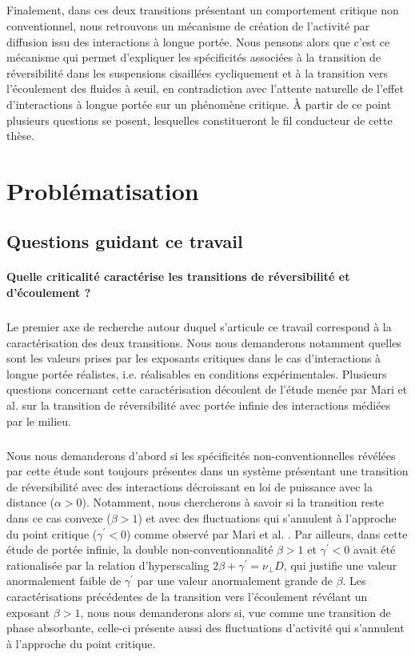 \subparagraph{}Finalement, dans ces deux transitions présentant un comportement critique non conventionnel, nous retrouvons un mécanisme de création de l'activité par diffusion issu des interactions à longue portée. Nous pensons alors que c'est ce mécanisme qui permet d'expliquer les spécificités associées à la transition de réversibilité dans les suspensions cisaillées cycliquement et à la transition vers l'écoulement des fluides à seuil, en contradiction avec l'attente naturelle de l'effet d'interactions à longue portée sur un phénomène critique. \`A partir de ce point plusieurs questions se posent, lesquelles constitueront le fil conducteur de cette thèse.

\section{Problématisation}

\subsection{Questions guidant ce travail}

\paragraph{Quelle criticalité caractérise les transitions de réversibilité et d'écoulement ?}

\subparagraph{}Le premier axe de recherche autour duquel s'articule ce travail correspond à la caractérisation des deux transitions. Nous nous demanderons notamment quelles sont les valeurs prises par les exposants critiques dans le cas d'interactions à longue portée réalistes, i.e. réalisables en conditions expérimentales. Plusieurs questions concernant cette caractérisation découlent de l'étude menée par Mari et al. \cite{mari_absorbing_2022} sur la transition de réversibilité avec portée infinie des interactions médiées par le milieu. 

\subparagraph{}Nous nous demanderons d'abord si les spécificités non-conventionnelles révélées par cette étude sont toujours présentes dans un système présentant une transition de réversibilité avec des interactions décroissant en loi de puissance avec la distance ($\alpha > 0$). Notamment, nous chercherons à savoir si la transition reste dans ce cas convexe ($\beta >1$) et avec des fluctuations qui s'annulent à l'approche du point critique ($\gamma^\prime < 0$) comme observé par Mari et al. \cite{mari_absorbing_2022}. Par ailleurs, dans cette étude de portée infinie, la double non-conventionnalité $\beta >1$ et $\gamma^\prime < 0$ avait été rationalisée par la relation d'hyperscaling $2\beta + \gamma^\prime = \nu_\perp D$, qui justifie une valeur anormalement faible de $\gamma^\prime$ par une valeur anormalement grande de $\beta$. Les caractérisations précédentes de la transition vers l'écoulement révélant un exposant $\beta >1$, nous nous demanderons alors si, vue comme une transition de phase absorbante, celle-ci présente aussi des fluctuations d'activité qui s'annulent à l'approche du point critique.

